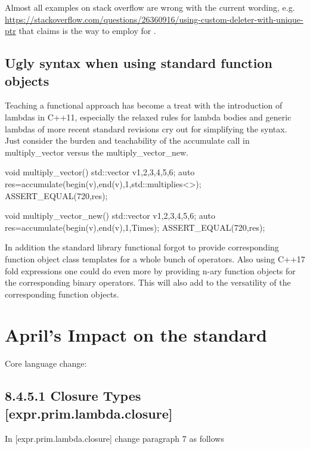 \documentclass[ebook,11pt,article]{memoir}
\begin{document}
Almost all examples on stack overflow are wrong with the current wording, e.g. \url{https://stackoverflow.com/questions/26360916/using-custom-deleter-with-unique-ptr} that claims  is the way to employ  for . 

\section{Ugly syntax when using standard function objects}

Teaching a functional approach has become a treat with the introduction of lambdas in C++11, especially the relaxed rules for lambda bodies and generic lambdas of more recent standard revisions cry out for simplifying the syntax. Just consider the burden and teachability of the accumulate call in multiply_vector versus the multiply_vector_new.

\begin{codeblock}
void multiply_vector(){
	std::vector v{1,2,3,4,5,6};
	auto res=accumulate(begin(v),end(v),1,std::multiplies<>{});
	ASSERT_EQUAL(720,res);
}
\end{codeblock}
\begin{codeblock}
void multiply_vector_new(){
	std::vector v{1,2,3,4,5,6};
	auto res=accumulate(begin(v),end(v),1,Times);
	ASSERT_EQUAL(720,res);
}
\end{codeblock}

In addition the standard library functional forgot to provide corresponding function object class templates for a whole bunch of operators. Also using C++17 fold expressions one could do even more by providing n-ary function objects for the corresponding binary operators. This will also add to the versatility of the corresponding function objects.


\chapter{April's Impact on the standard}

Core language change:
\section{8.4.5.1 Closure Types [expr.prim.lambda.closure]}

In [expr.prim.lambda.closure] change paragraph 7 as follows
\end{document}
